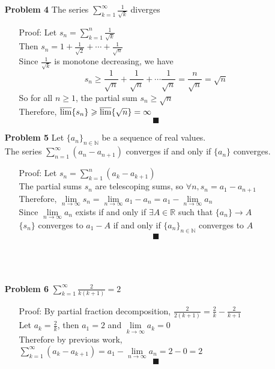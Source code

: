 \documentclass[a4paper,12pt]{report}
\begin{document}
\begin{enumerate}
\item[\bf{Problem 4}] The series $\sum\limits_{k=1}^{\infty} \frac{1}{\sqrt{k}}$ diverges
	\begin{enumerate}
	\item[Proof:] 
	Let $s_n = \sum\limits_{k=1}^{n} \frac{1}{\sqrt{k}}$ \\
	Then $s_n = 1 + \frac{1}{\sqrt{2}} + \cdots + \frac{1}{\sqrt{n}}$ \\
	Since $\frac{1}{\sqrt{k}}$ is monotone decreasing, we have
	\[
		s_n \geqslant 
		\frac{1}{\sqrt{n}} + \frac{1}{\sqrt{n}} + \cdots \frac{1}{\sqrt{n}}
		= \frac{n}{\sqrt{n}} = \sqrt{n}
	\]
	So for all $n \geqslant 1$, the partial sum $s_n \geqslant \sqrt{n}$ \\
	Therefore, $\varlimsup\{s_n\} \geqslant \varlimsup\{\sqrt{n}\} = \infty$ 
	\[\blacksquare\]
	\end{enumerate}
\pagebreak
\item[\bf{Problem 5}] Let $\{a_n\}_{n\in\mathbb{N}}$ be a sequence of real values. \\
	The series $\sum\limits_{n=1}^{\infty}(a_n - a_{n+1})$ converges if and only if $\{a_n\}$ converges.
	\begin{enumerate}
	\item[Proof:] 
	Let $s_n = \sum\limits_{k=1}^{n}(a_k - a_{k+1})$ \\
	The partial sums $s_n$ are telescoping sums, so $\forall n, s_n = a_1 - a_{n+1}$ \\
	Therefore, $\lim\limits_{n \to \infty} s_n = \lim\limits_{n \to \infty} a_1 - a_n = a_1 - \lim\limits_{n \to \infty} a_n$ \\
	Since $\lim\limits_{n \to \infty} a_n$ exists if and only if $\exists A \in \mathbb{R}$ such that $\{a_n\} \to A$ \\
	$\{s_n\}$ converges to $a_1 - A$ if and only if $\{a_n\}_{n\in\mathbb{N}}$ converges to $A$
	\[\blacksquare\]\\\\\\
	\end{enumerate}

\item[\bf{Problem 6}] $\sum\limits_{k=1}^{\infty}\frac{2}{k(k+1)} = 2$
	\begin{enumerate}
	\item[Proof:]
	By partial fraction decomposition, $\frac{2}{2(k+1)} = \frac{2}{k} - \frac{2}{k+1}$ \\
	Let $a_k = \frac{2}{k}$, then $a_1 = 2$ and $\lim\limits_{k \to \infty} a_k = 0$ \\
	Therefore by previous work, \\
	$\sum\limits_{k=1}^{\infty}(a_k - a_{k+1}) = a_1 - \lim\limits_{n \to \infty}a_n = 2 - 0 = 2$
	\[\blacksquare\]\\\\\\
	\end{enumerate}


\end{enumerate}
\end{document}

